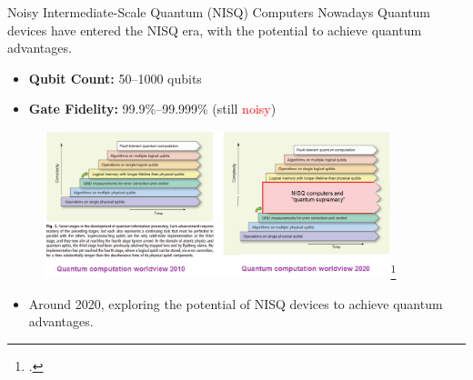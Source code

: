 \documentclass[10pt]{beamer}
\begin{document}
\begin{CJK}{UTF8}{gbsn}
\begin{frame}[fragile]{Noisy Intermediate-Scale Quantum (NISQ) Computers}
 Nowadays Quantum devices have entered the NISQ era, with the potential to achieve quantum advantages.
  \begin{itemize}
    \item \textbf{Qubit Count:} 50--1000 qubits
    \item \textbf{Gate Fidelity:} 99.9\%--99.999\% (still \textcolor{red}{noisy})
  \end{itemize}
  \begin{figure}
    \centering
    \includegraphics[width=0.9\textwidth]{fig/2010-2020d.png}\footcite{nisq}
  \end{figure}
  \begin{itemize}
    \item Around 2020, exploring the potential of NISQ devices to achieve quantum advantages.
  \end{itemize}
  \vspace{0.25em}
\end{frame}
\end{CJK}
\end{document}
